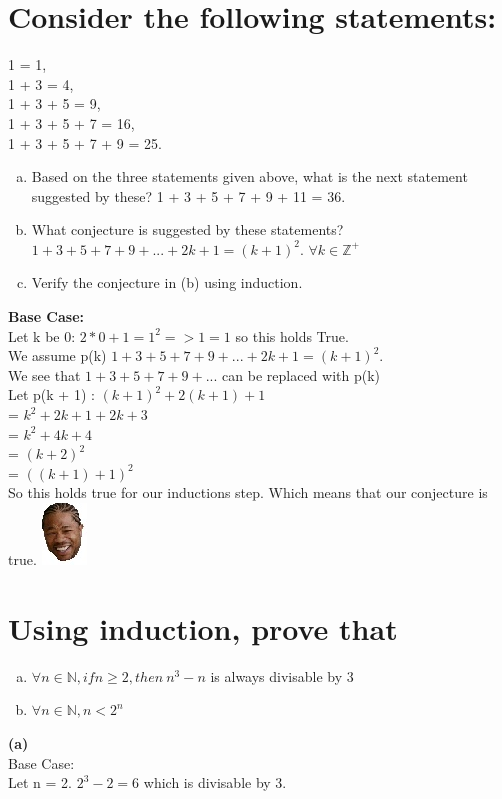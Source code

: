 \section{Consider the following statements:}
1 = 1,\\
1 + 3 = 4,\\
1 + 3 + 5 = 9,\\
1 + 3 + 5 + 7 = 16,\\
1 + 3 + 5 + 7 + 9 = 25.\\
\begin{enumerate}[(a)]
\item Based on the three statements given above, what is the next statement suggested by these?
1 + 3 + 5 + 7 + 9 + 11 = 36.
\item What conjecture is suggested by these statements?
$1 + 3 + 5 + 7 + 9 + ... + 2k + 1 = (k + 1)^2$. $\forall k \in \mathbb{Z}^{+}$
\item Verify the conjecture in (b) using induction.
\end{enumerate}
\textbf{Base Case:}\\
Let k be 0: $2*0 + 1 = 1^2 => 1 = 1$ so this holds True.\\
We assume p(k)
$1 + 3 + 5 + 7 + 9 + ... + 2k + 1 = (k + 1)^2$.\\
We see that $1 + 3 + 5 + 7 + 9 + ...$ can be replaced with p(k)\\
Let p(k + 1) : $(k + 1)^2 + 2(k + 1) + 1$\\
 = $k^2 + 2k + 1 + 2k + 3$\\
 = $k^2 + 4k + 4$\\
 = $(k + 2)^2$\\
 = $((k + 1) + 1)^2$\\
 So this holds true for our inductions step. Which means that our conjecture is true. \includegraphics[scale=0.70]{billeder/xzibit}


\section{Using induction, prove that}
\begin{enumerate}[(a)]
\item $\forall n \in \mathbb{N}, if n\geq 2, then \ n^3-n$ is always divisable by 3
\item $\forall n \in \mathbb{N},n < 2^n$
\end{enumerate}
\textbf{(a)}\\
Base Case:\\
Let n = 2. $2^3 - 2 = 6$ which is divisable by 3.\\

